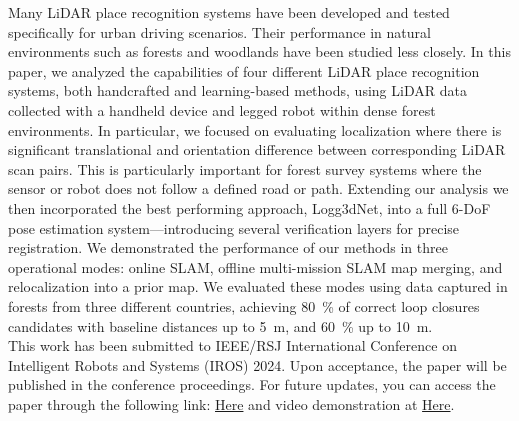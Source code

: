 
Many LiDAR place recognition systems have been developed and tested specifically for urban driving scenarios. Their performance in natural environments such as forests and woodlands have been studied less closely.
In this paper, we analyzed the capabilities of four different LiDAR place recognition systems, both handcrafted and learning-based methods, using LiDAR data collected with a handheld device and legged robot within dense forest environments. 
In particular, we focused on evaluating localization where there is significant translational and orientation difference between corresponding LiDAR scan pairs. This is particularly important for forest survey systems where the sensor or robot does not follow a defined road or path. 
Extending our analysis we then incorporated the best performing approach, Logg3dNet, into a full 6-DoF pose estimation system---introducing several verification layers for precise registration. 
We demonstrated the performance of our methods in three operational modes: online SLAM, offline multi-mission SLAM map merging, and relocalization into a prior map. 
We evaluated these modes using data captured in forests from three different countries, achieving \SI{80}{\percent} of correct loop closures candidates with baseline distances up to \SI{5}{\meter}, and \SI{60}{\percent} up to \SI{10}{\meter}.  \\

This work has been submitted to IEEE/RSJ International Conference on Intelligent Robots and Systems (IROS) 2024. Upon acceptance, the paper will be published in the conference proceedings. For future updates, you can access the paper through the following link: \url{Here} and video demonstration at \url{Here}.